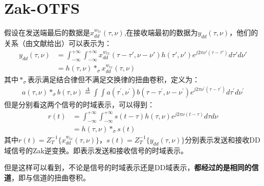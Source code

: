 \documentclass[12pt,a4paper]{article}%
\begin{document}
	\section{Zak-OTFS}
	假设在发送端最后的数据是$x_{dd}^{w_{tx}}(\tau,\nu)$,在接收端最初的数据为$y_{dd}(\tau,\nu)$，他们的关系（由文献给出）可以表示为：
	\begin{equation}
		\label{eq8.1}
		\begin{aligned}
			y_{dd}(\tau,\nu) &= \int_{-\infty}^{+\infty}\int_{-\infty}^{+\infty}x_{dd}^{w_{tx}}(\tau-\tau',\nu-\nu') h(\tau',\nu') e^{j2\pi\nu' (\tau-\tau')}d\tau' d\nu'\\
			&= h(\tau,\nu) *_\sigma x_{dd}^{w_{tx}}(\tau,\nu)
		\end{aligned}
	\end{equation}
	其中$*_\sigma$表示满足结合律但不满足交换律的扭曲卷积，定义为：
	\begin{equation}
		\label{eq9.1}
		\begin{aligned}
			a(\tau,\nu)*_{\sigma}b(\tau,\nu)\stackrel{\Delta}{=}\int\int a(\tau^{\prime},\nu^{\prime})b(\tau-\tau^{\prime},\nu-\nu^{\prime})e^{j2\pi\nu^{\prime}(\tau-\tau^{\prime})}d\tau^{\prime}d\nu^{\prime}
		\end{aligned}
	\end{equation}
	但是分别看这两个信号的时域表示，可以得到：
	\begin{equation}
		\label{eq10.1}
		\begin{aligned}
			r(t)&=\int_{-\infty}^{+\infty} \int_{-\infty}^{+\infty} s(t-\tau)h(\tau,\nu)e^{j2\pi\nu(t-\tau)}d\tau d\nu\\
			&= h(\tau,\nu)*_\sigma s(t)
		\end{aligned}
	\end{equation}
	其中$r(t)=Z^{-1}_T\{ x_{dd}^{w_{tx}}(\tau,\nu) \}$，$s(t)=Z^{-1}_T\{ y_{dd}(\tau,\nu) \}$分别表示发送和接收DD域信号的Zak逆变换。即表示发送和接收信号的时域表示。
	\par
	但是这样可以看到，不论是信号的时域表示还是DD域表示，\textbf{都经过的是相同的信道}，即与信道的扭曲卷积。

	\vspace{.5cm}
\end{document}
